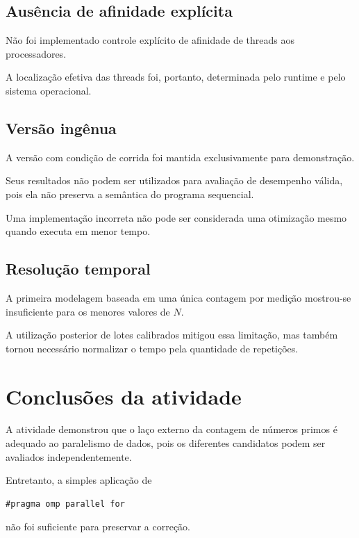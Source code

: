 \subsection{Ausência de afinidade explícita}

Não foi implementado controle explícito de afinidade de threads aos
processadores.

A localização efetiva das threads foi, portanto, determinada pelo runtime e
pelo sistema operacional.


\subsection{Versão ingênua}

A versão com condição de corrida foi mantida exclusivamente para
demonstração.

Seus resultados não podem ser utilizados para avaliação de desempenho
válida, pois ela não preserva a semântica do programa sequencial.

Uma implementação incorreta não pode ser considerada uma otimização mesmo
quando executa em menor tempo.


\subsection{Resolução temporal}

A primeira modelagem baseada em uma única contagem por medição mostrou-se
insuficiente para os menores valores de \(N\).

A utilização posterior de lotes calibrados mitigou essa limitação, mas
também tornou necessário normalizar o tempo pela quantidade de repetições.


\section{Conclusões da atividade}
\label{sec:atvd05-conclusao}

A atividade demonstrou que o laço externo da contagem de números primos é
adequado ao paralelismo de dados, pois os diferentes candidatos podem ser
avaliados independentemente.

Entretanto, a simples aplicação de

\begin{verbatim}
#pragma omp parallel for
\end{verbatim}

não foi suficiente para preservar a correção.

